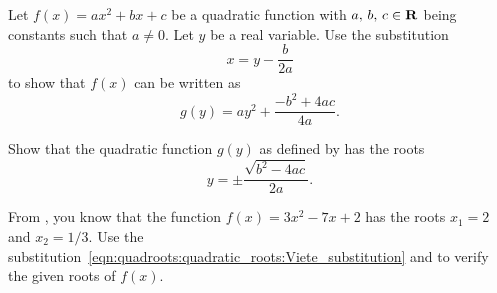 \documentclass[a4paper,oneside,12pt]{article}
\begin{document}
\begin{problem}
\begin{packedenum}
  \item\label{subprob:quadroots:quadratic_roots:Viete_substitution}
    Let $f(x) = ax^2 + bx + c$ be a quadratic function with
    ${a},\, {b},\, {c} \in \mathbf{R}$ being constants such that $a \neq 0$.
    Let $y$ be a real variable.  Use the substitution
    \begin{equation}
    \label{eqn:quadroots:quadratic_roots:Viete_substitution}
    x
    =
    y - \frac{b}{2a}
    \end{equation}
    to show that $f(x)$ can be written as
    \begin{equation}
    \label{eqn:quadroots:quadratic_roots:Viete_substitution_expand}
    g(y)
    =
    ay^2
    +
    \frac{-b^2 + 4ac}{4a}.
    \end{equation}

  \item\label{subprob:quadroots:quadratic_roots:Viete_quadratic_formula}
    Show that the quadratic function $g(y)$ as defined by
    has the roots
    \begin{equation}
    \label{eqn:quadroots:quadratic_roots:Viete_quadratic_formula}
    y
    =
    \pm
    \frac{
      \sqrt{b^2 - 4ac}
    }{
      2a
    }.
    \end{equation}

  \item\label{subprob:quadroots:quadratic_roots:Viete_quadratic_formula_verify}
    From , you
    know that the function $f(x) = 3x^2 - 7x + 2$ has the roots
    $x_1 = 2$ and $x_2 = 1/3$.  Use the
    substitution~\eqref{eqn:quadroots:quadratic_roots:Viete_substitution}
    and
    to verify the given roots of $f(x)$.
  \end{packedenum}
\end{problem}
\end{document}

